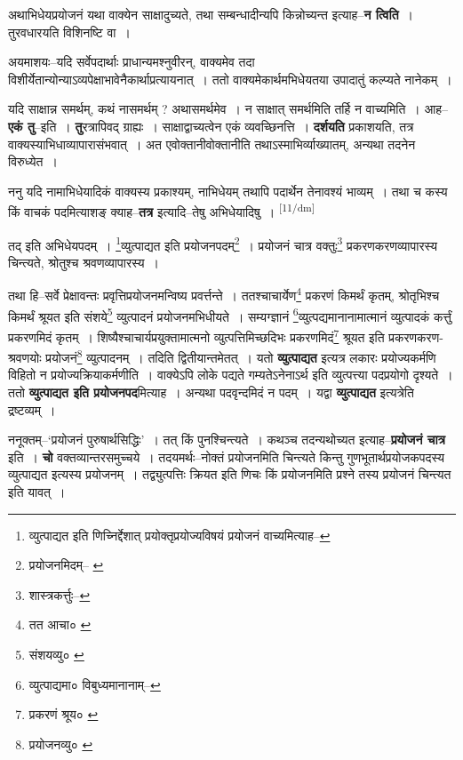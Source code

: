 \documentclass[article,12pt,a4paper]{memoir}
\begin{document}
	  \pstart अथाभिधेयप्रयोजनं यथा वाक्येन साक्षादुच्यते, तथा सम्बन्धादीन्यपि किन्नोच्यन्त इत्याह--\textbf{न त्विति} । तुरवधारयति विशिनष्टि वा ।
	\pend
      

	  \pstart अयमाशयः--यदि सर्वेपदार्थाः प्राधान्यमश्नुवीरन्, वाक्यमेव तदा विशीर्येतान्योन्याऽव्यपेक्षाभावेनैकार्थाप्रत्यायनात् । ततो वाक्यमेकार्थमभिधेयतया उपादातुं कल्प्यते नानेकम् ।
	\pend
      

	  \pstart यदि साक्षान्न समर्थम्, कथं नासमर्थम् ? अथासमर्थमेव । न साक्षात् समर्थमिति तर्हि न वाच्यमिति । आह--\textbf{एकं तु}--इति । \textbf{तु}रत्रापिवद् ग्राह्यः । साक्षाद्वाच्यत्वेन एकं व्यवच्छिनत्ति । \textbf{दर्शयति} प्रकाशयति, तत्र वाक्यस्याभिधाव्यापारासंभवात् । अत एवोक्तानीवोक्तानीति तथाऽस्माभिर्व्याख्यातम्, अन्यथा तदनेन विरुध्येत ।
	\pend
      

	  \pstart ननु यदि नामाभिधेयादिकं वाक्यस्य प्रकाश्यम्, नाभिधेयम् तथापि पदार्थेन तेनावश्यं भाव्यम् । तथा च कस्य किं वाचकं पदमित्याशङ् क्याह--\textbf{तत्र} इत्यादि--तेषु अभिधेयादिषु ।  \leavevmode\textsuperscript{\rmlatinfont\tiny [11/dm]} 
	  
	तद् इति अभिधेयपदम् । \footnote{व्युत्पाद्यत इति णिच्निर्द्देशात् प्रयोक्तृप्रयोज्यविषयं प्रयोजनं वाच्यमित्याह--\cite{dp-msD-n}}व्युत्पाद्यत इति प्रयोजनपदम्\footnote{प्रयोजनमिदम्--\cite{dp-msA} \cite{dp-edP} \cite{dp-edH}} । प्रयोजनं चात्र वक्तुः\footnote{शास्त्रकर्त्तुः--\cite{dp-msD-n}} प्रकरणकरणव्यापारस्य चिन्त्यते, श्रोतुश्च श्रवणव्यापारस्य । 
	  
	तथा हि--सर्वे प्रेक्षावन्तः प्रवृत्तिप्रयोजनमन्विष्य प्रवर्त्तन्ते । ततश्चाचार्येण\footnote{तत आचा० \cite{dp-msA} \cite{dp-edP}} प्रकरणं किमर्थं कृतम्, श्रोतृभिश्च किमर्थं श्रूयत इति संशये\footnote{संशयव्यु० \cite{dp-edP} \cite{dp-edH}} व्युत्पादनं प्रयोजनमभिधीयते । सम्यग्ज्ञानं \footnote{व्युत्पाद्यमा० \cite{dp-msB} \cite{dp-edE} \cite{dp-edH} \cite{dp-edN} विबुध्यमानानाम्--\cite{dp-msD-n}}व्युत्पद्यमानानामात्मानं व्युत्पादकं कर्त्तुं प्रकरणमिदं कृतम् । शिष्यैश्चाचार्यप्रयुक्तामात्मनो व्युत्पत्तिमिच्छदिभः प्रकरणमिदं\footnote{प्रकरणं श्रूय० \cite{dp-msC} \cite{dp-msD} \cite{dp-msB}} श्रूयत इति प्रकरणकरण-श्रवणयोः प्रयोजनं\footnote{प्रयोजनव्यु० \cite{dp-edH} \cite{dp-edN}} व्युत्पादनम् । तदिति द्वितीयान्तमेतत् । यतो \textbf{व्युत्पाद्यत} इत्यत्र लकारः प्रयोज्यकर्मणि विहितो न प्रयोज्यक्रियाकर्मणीति । वाक्येऽपि लोके पद्यते गम्यतेऽनेनाऽर्थ इति व्युत्पत्त्या पदप्रयोगो दृश्यते । ततो \textbf{व्युत्पाद्यत इति प्रयोजनपद}मित्याह । अन्यथा पदवृन्दमिदं न पदम् । यद्वा \textbf{व्युत्पाद्यत} इत्यत्रेति द्रष्टव्यम् ।
	\pend
      

	  \pstart ननूक्तम्--‘प्रयोजनं पुरुषार्थसिद्धिः’ । तत् किं पुनश्चिन्त्यते । कथञ्च तदन्यथोच्यत इत्याह--\textbf{प्रयोजनं चात्र} इति । \textbf{चो} वक्तव्यान्तरसमुच्चये । तदयमर्थः--नोक्तं प्रयोजनमिति चिन्त्यते किन्तु गुणभूतार्थप्रयोजकपदस्य व्युत्पाद्यत इत्यस्य प्रयोजनम् । तद्व्युत्पत्तिः क्रियत इति णिचः किं प्रयोजनमिति प्रश्ने तस्य प्रयोजनं चिन्त्यत इति यावत् ।
	\pend
      
\end{document}
